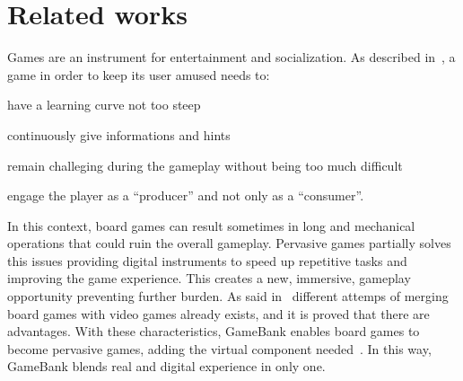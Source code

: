 \section{Related works}
\label{related_works}

Games are an instrument for entertainment and socialization. As described 
in~\cite{gee03}, a game in order to keep its user amused needs to:
\begin{enumerate*}[label=\roman*)]
 \item have a learning curve not too steep
 \item continuously give informations and hints
 \item remain challeging during the gameplay without being too much difficult
 \item engage the player as a ``producer'' and not only as a ``consumer''.
\end{enumerate*}
In this context, board games can result sometimes in long and mechanical 
operations that could ruin the overall gameplay. Pervasive games partially 
solves this issues providing digital instruments to speed up repetitive 
tasks and improving the game experience. This creates a new, immersive, 
gameplay opportunity preventing further burden.
As said in~\cite{mandryk02} different attemps of merging board games with video 
games already exists, and it is proved that there are advantages.
With these characteristics, GameBank enables board games to become pervasive 
games, adding the virtual component needed~\cite{arango17}. 
In this way, GameBank blends real and digital experience in only one.
